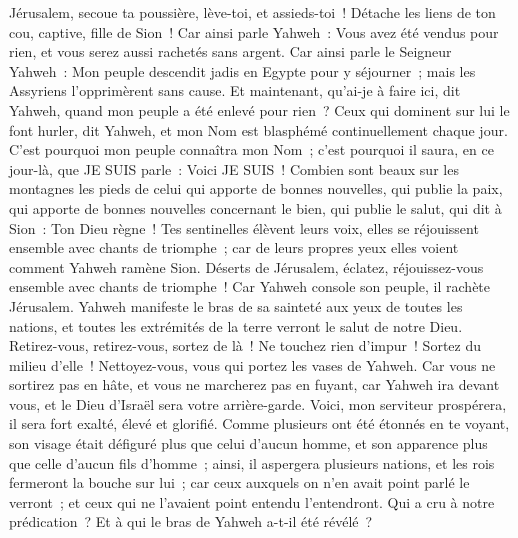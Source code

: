 \begin{multicols}{2}
Jérusalem, secoue ta poussière, lève-toi, et assieds-toi~! Détache les liens de ton cou, captive, fille de Sion~!
Car ainsi parle Yahweh~: Vous avez été vendus pour rien, et vous serez aussi rachetés sans argent.
Car ainsi parle le Seigneur Yahweh~: Mon peuple descendit jadis en Egypte pour y séjourner~; mais les Assyriens l'opprimèrent sans cause.
Et maintenant, qu'ai-je à faire ici, dit Yahweh, quand mon peuple a été enlevé pour rien~? Ceux qui dominent sur lui le font hurler, dit Yahweh, et mon Nom est blasphémé continuellement chaque jour.
C'est pourquoi mon peuple connaîtra mon Nom~; c'est pourquoi il saura, en ce jour-là, que JE SUIS parle~: Voici JE SUIS~!
Combien sont beaux sur les montagnes les pieds de celui qui apporte de bonnes nouvelles, qui publie la paix, qui apporte de bonnes nouvelles concernant le bien, qui publie le salut, qui dit à Sion~: Ton Dieu règne~!
Tes sentinelles élèvent leurs voix, elles se réjouissent ensemble avec chants de triomphe~; car de leurs propres yeux elles voient comment Yahweh ramène Sion.
Déserts de Jérusalem, éclatez, réjouissez-vous ensemble avec chants de triomphe~! Car Yahweh console son peuple, il rachète Jérusalem.
Yahweh manifeste le bras de sa sainteté aux yeux de toutes les nations, et toutes les extrémités de la terre verront le salut de notre Dieu.
Retirez-vous, retirez-vous, sortez de là~! Ne touchez rien d'impur~! Sortez du milieu d'elle~! Nettoyez-vous, vous qui portez les vases de Yahweh.
Car vous ne sortirez pas en hâte, et vous ne marcherez pas en fuyant, car Yahweh ira devant vous, et le Dieu d'Israël sera votre arrière-garde.
Voici, mon serviteur prospérera, il sera fort exalté, élevé et glorifié.
Comme plusieurs ont été étonnés en te voyant, son visage était défiguré plus que celui d'aucun homme, et son apparence plus que celle d'aucun fils d'homme~;
ainsi, il aspergera plusieurs nations, et les rois fermeront la bouche sur lui~; car ceux auxquels on n'en avait point parlé le verront~; et ceux qui ne l'avaient point entendu l'entendront.
\VerseOne{}Qui a cru à notre prédication~? Et à qui le bras de Yahweh a-t-il été révélé~?

\end{multicols}
